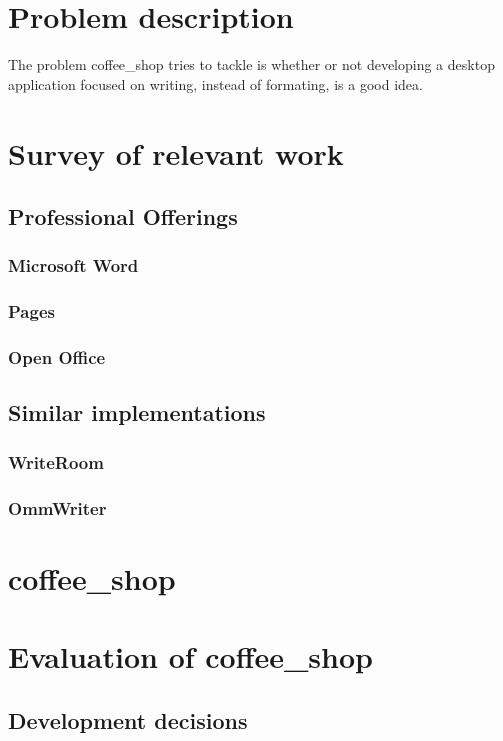 \documentclass[11pt]{article}
\begin{document}
\section{Problem description}

The problem coffee\_shop tries to tackle is whether or not developing a desktop application focused on writing, instead of formating, is a good idea.

\section{Survey of relevant work}
\subsection{Professional Offerings}

\subsubsection{Microsoft Word}
\subsubsection{Pages}
\subsubsection{Open Office}

\subsection{Similar implementations}

\subsubsection{WriteRoom}

\subsubsection{OmmWriter}

\section{coffee\_shop}

\section{Evaluation of coffee\_shop}
\subsection{Development decisions}
\end{document}
